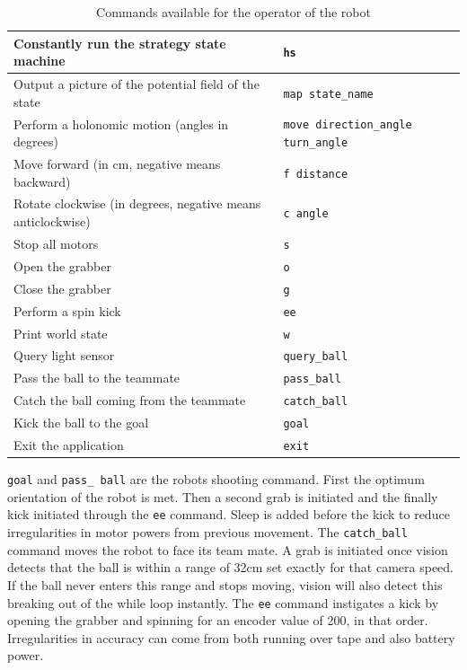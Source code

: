 \documentclass[a4paper,12pt]{article}
\begin{document}
\begin{table}[h!]
\centering
\begin{tabular}{ | p{9cm} | p{6.2cm} | }
    \hline
    Constantly run the strategy state machine &
    \small{\texttt{hs}} \\ \hline
    Output a picture of the potential field of the state &
    \small{\texttt{map state\_name}} \\ \hline
    Perform a holonomic motion (angles in degrees) &
    \small{\texttt{move direction\_angle turn\_angle}} \\ \hline
    Move forward (in cm, negative means backward) &
    \small{\texttt{f distance}} \\ \hline
    Rotate clockwise (in degrees, negative means anticlockwise) &
    \small{\texttt{c angle}} \\ \hline
    Stop all motors &
    \small{\texttt{s}} \\ \hline
    Open the grabber &
    \small{\texttt{o}} \\ \hline
    Close the grabber &
    \small{\texttt{g}} \\ \hline
    Perform a spin kick &
    \small{\texttt{ee}} \\ \hline
    Print world state &
    \small{\texttt{w}} \\ \hline
    Query light sensor &
    \small{\texttt{query\_ball}} \\ \hline
    Pass the ball to the teammate &
    \small{\texttt{pass\_ball}} \\ \hline
    Catch the ball coming from the teammate &
    \small{\texttt{catch\_ball}} \\ \hline
    Kick the ball to the goal &
    \small{\texttt{goal}} \\ \hline
    Exit the application &
    \small{\texttt{exit}} \\ \hline
\end{tabular}
\caption{Commands available for the operator of the robot}
\label{tab:commands}
\end{table}

\texttt{goal} and \texttt{pass\_ ball} are the robots shooting command. First the optimum orientation of the robot is met. Then a second grab is initiated and the finally kick initiated through the \texttt{ee} command. Sleep is added before the kick to reduce irregularities in motor powers from previous movement. The \texttt{catch\_ball} command moves the robot to face its team mate. A grab is initiated once vision detects that the ball is within a range of 32cm set exactly for that camera speed. If the ball never enters this range and stops moving, vision will also detect this breaking out of the while loop instantly. The \texttt{ee} command instigates a kick by opening the grabber and spinning for an encoder value of 200, in that order. Irregularities in accuracy can come from both running over tape and also battery power.
\end{document}
